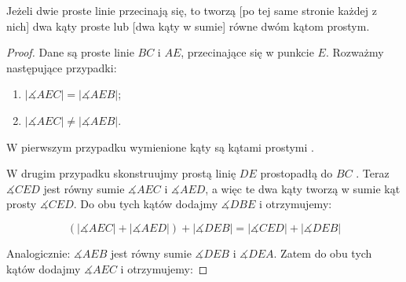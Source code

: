 \documentclass[12pt, a4paper]{scrartcl}
\begin{document}
\begin{theorem}
    Jeżeli dwie proste linie przecinają się, to tworzą [po tej same stronie
    każdej z nich] dwa kąty proste lub [dwa kąty w sumie] równe dwóm kątom
    prostym.

    \begin{figure}[!h]
        \begin{center}
        \end{center}
    \end{figure}

    \begin{proof}
        Dane są proste linie \(BC\) i \(AE\), przecinające się w punkcie \(E\).
        Rozważmy następujące przypadki:

        \begin{enumerate}
            \item \(|\measuredangle AEC| = |\measuredangle AEB|\);
            \item \(|\measuredangle AEC| \neq |\measuredangle AEB|\).
        \end{enumerate}

        W pierwszym przypadku wymienione kąty są kątami prostymi .

        W drugim przypadku skonstruujmy prostą linię \(DE\) prostopadłą do
        \(BC\) . Teraz \(\measuredangle CED\) jest równy sumie
        \(\measuredangle AEC\) i \(\measuredangle AED\), a więc te dwa kąty
        tworzą w sumie kąt prosty \(\measuredangle CED\). Do obu tych kątów
        dodajmy \(\measuredangle DBE\)  i otrzymujemy:

        \[ (|\measuredangle AEC| + |\measuredangle AED|) + |\measuredangle DEB|
            = |\measuredangle CED| + |\measuredangle DEB| \]

        Analogicznie: \(\measuredangle AEB\) jest równy sumie \(\measuredangle
        DEB\) i \(\measuredangle DEA\). Zatem do obu tych kątów dodajmy
        \(\measuredangle AEC\)  i otrzymujemy:


\end{proof}
\end{theorem}
\end{document}
